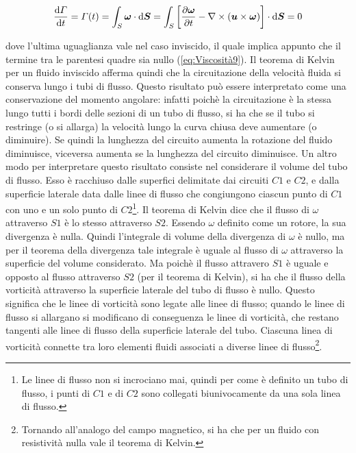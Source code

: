 \begin{EQ}
\begin{equation}
\der{\Gamma}{t} = \Gamma (t) = \int_S \scal{\omega}{}\dd \V{S} = \int_S \quadre{\derP{\V{\omega}}{t}-\Rot{}(\vett{u}{\omega})}\cdot \dd \V{S} = 0
\end{equation}
\end{EQ}
dove l'ultima uguaglianza vale nel caso inviscido, il quale implica appunto che il termine tra le parentesi quadre sia nullo (\ref{eq:Viscosità9}). Il teorema di Kelvin per un fluido inviscido afferma quindi che la circuitazione della velocità fluida si conserva lungo i tubi di flusso. Questo risultato può essere interpretato come una conservazione del momento angolare: infatti poichè la circuitazione è la stessa lungo tutti i bordi delle sezioni di un tubo di flusso, si ha che se il tubo si restringe (o si allarga) la velocità lungo la curva chiusa deve aumentare (o diminuire). Se quindi la lunghezza del circuito aumenta la rotazione del fluido diminuisce, viceversa aumenta se la lunghezza del circuito diminuisce. Un altro modo per interpretare questo risultato consiste nel considerare il volume del tubo di flusso. Esso è racchiuso dalle superfici delimitate dai circuiti $C1$ e $C2$, e dalla superficie laterale data dalle linee di flusso che congiungono ciascun punto di $C1$ con uno e un solo punto di $C2$\footnote{Le linee di flusso non si incrociano mai, quindi per come è definito un tubo di flusso, i punti di $C1$ e di $C2$ sono collegati biunivocamente da una sola linea di flusso.}. Il teorema di Kelvin dice che il flusso di $\omega$ attraverso $S1$ è lo stesso attraverso $S2$. Essendo $\omega$ definito come un rotore, la sua divergenza è nulla. Quindi l'integrale di volume della divergenza di $\omega$ è nullo, ma per il teorema della divergenza tale integrale è uguale al flusso di $\omega$ attraverso la superficie del volume considerato. Ma poichè il flusso attravero $S1$ è uguale e opposto al flusso attraverso $S2$ (per il teorema di Kelvin), si ha che il flusso della vorticità attraverso la superficie laterale del tubo di flusso è nullo. Questo significa che le linee di vorticità sono legate alle linee di flusso; quando le linee di flusso si allargano si modificano di conseguenza le linee di vorticità, che restano tangenti alle linee di flusso della superficie laterale del tubo. Ciascuna linea di vorticità connette tra loro elementi fluidi associati a diverse linee di flusso\footnote{Tornando all'analogo del campo magnetico, si ha che per un fluido con resistività nulla vale il teorema di Kelvin.}.

